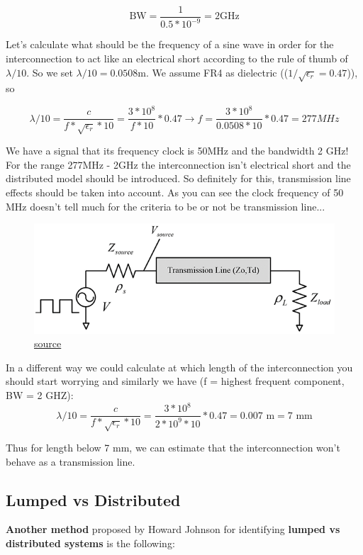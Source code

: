 \documentclass[12pt]{article}
\begin{document}
\[\text{BW} = \frac{1}{0.5 * 10^{-9}} = 2 \text{GHz}\]

Let's calculate what should be the frequency of a sine wave in order for the interconnection to act like an electrical short according to the rule of thumb of $\lambda/10$. So we set $\lambda/10 = 0.0508 \text{m}$. We assume FR4 as dielectric (($1/\sqrt{\epsilon_r} = 0.47$)), so

\[\lambda/10 = \frac{c}{f * \sqrt{\epsilon_r} * 10} = \frac{3 * 10^8}{f * 10} * 0.47 \rightarrow f = \frac{3 * 10^8}{0.0508 * 10} * 0.47 = 277 MHz \]

We have a signal that its frequency clock is 50MHz and the bandwidth 2 GHz! For the range 277MHz - 2GHz the interconnection isn't electrical short and the distributed model should be introduced. So definitely for this, transmission line effects should be taken into account. As you can see the clock frequency of 50 MHz doesn't tell much for the criteria to be or not be transmission line... 

\begin{figure}[h!]
	\centering
	\includegraphics[keepaspectratio, width = \textwidth]{assets/transmission_input.png}
	\caption{\href{https://incompliancemag.com/article/an-overview-of-transmission-lines-in-electronic-systems/}{source}}
\end{figure}

In a different way we could calculate at which length of the interconnection you should start worrying and similarly we have (f = highest frequent component, BW = 2 GHZ):
\[\lambda/10 = \frac{c}{f * \sqrt{\epsilon_r} * 10} = \frac{3 * 10^8}{2*10^9 * 10} * 0.47 = 0.007 \text{ m} = 7 \text{ mm} \]

Thus for length below 7 mm, we can estimate that the interconnection won't behave as a transmission line.

\subsection{Lumped vs Distributed}
\textbf{Another method} proposed by Howard Johnson for identifying \textbf{lumped vs distributed systems} is the following:
\end{document}

